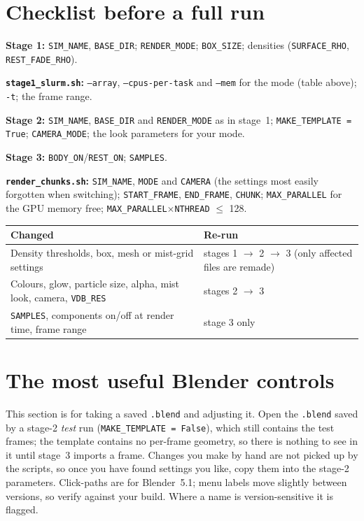 \documentclass[11pt]{article}
\newcommand{\pc}[1]{\texttt{#1}}
\begin{document}
\section{Checklist before a full run}
\textbf{Stage 1:} \pc{SIM\_NAME}, \pc{BASE\_DIR}; \pc{RENDER\_MODE}; \pc{BOX\_SIZE}; densities (\pc{SURFACE\_RHO}, \pc{REST\_FADE\_RHO}).
 
\textbf{\pc{stage1\_slurm.sh}:} \pc{--array}, \pc{--cpus-per-task} and \pc{--mem} for the mode (table above); \pc{-t}; the frame range.
 
\textbf{Stage 2:} \pc{SIM\_NAME}, \pc{BASE\_DIR} and \pc{RENDER\_MODE} as in stage~1; \pc{MAKE\_TEMPLATE = True}; \pc{CAMERA\_MODE}; the look parameters for your mode.
 
\textbf{Stage 3:} \pc{BODY\_ON}/\pc{REST\_ON}; \pc{SAMPLES}.
 
\textbf{\pc{render\_chunks.sh}:} \pc{SIM\_NAME}, \pc{MODE} and \pc{CAMERA} (the settings most easily forgotten when switching); \pc{START\_FRAME}, \pc{END\_FRAME}, \pc{CHUNK}; \pc{MAX\_PARALLEL} for the GPU memory free; \pc{MAX\_PARALLEL}$\times$\pc{NTHREAD} $\le$ 128.
 
\begin{center}\small
\begin{tabular}{@{}P{9.5cm} P{3.5cm}@{}}
\hline
\textbf{Changed} & \textbf{Re-run} \\
\hline
Density thresholds, box, mesh or mist-grid settings & stages 1 $\rightarrow$ 2 $\rightarrow$ 3 (only affected files are remade) \\
Colours, glow, particle size, alpha, mist look, camera, \pc{VDB\_RES} & stages 2 $\rightarrow$ 3 \\
\pc{SAMPLES}, components on/off at render time, frame range & stage 3 only \\
\hline
\end{tabular}
\end{center}
 
\section{The most useful Blender controls}
\label{sec:gui}
This section is for taking a saved \pc{.blend} and adjusting it. Open the \pc{.blend} saved by a stage-2 \emph{test} run (\pc{MAKE\_TEMPLATE = False}), which still contains the test frames; the template contains no per-frame geometry, so there is nothing to see in it until stage~3 imports a frame. Changes you make by hand are not picked up by the scripts, so once you have found settings you like, copy them into the stage-2 parameters. Click-paths are
for Blender~5.1; menu labels move slightly between versions, so verify against
your build. Where a name is version-sensitive it is flagged.
 
\end{document}
